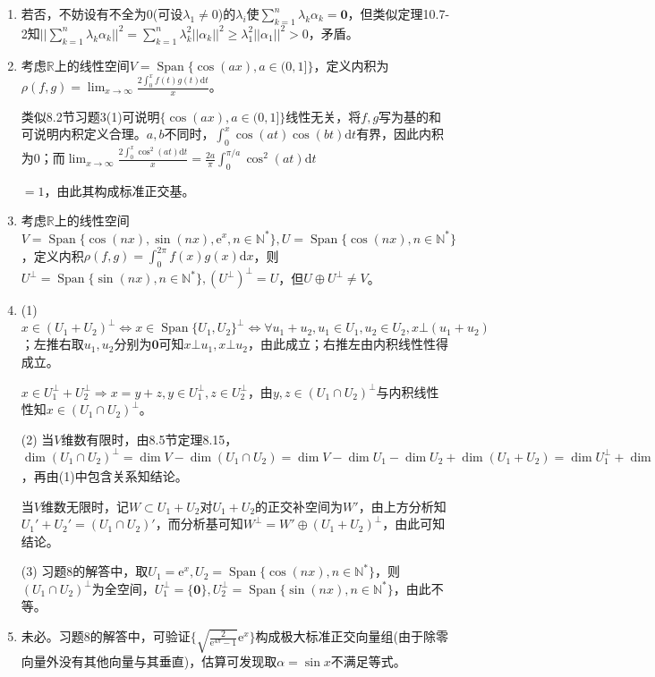 \documentclass[a4paper,UTF8,fontset=windows]{ctexart}
\DeclareMathOperator{\Span}{Span}
\begin{document}
\begin{enumerate}
\item
若否，不妨设有不全为0(可设$\lambda_1\ne0$)的$\lambda_i$使$\sum_{k=1}^n\lambda_k\alpha_k=\mathbf{0}$，但类似定理10.7-2知$\bigg|\bigg|\sum_{k=1}^n\lambda_k\alpha_k\bigg|\bigg|^2=\sum_{k=1}^n\lambda_k^2||\alpha_k||^2\ge\lambda_1^2||\alpha_1||^2>0$，矛盾。

\item
考虑$\mathbb{R}$上的线性空间$V=\Span\{\cos(ax),a\in(0,1]\}$，定义内积为$\rho(f,g)=\lim_{x\to\infty}\frac{2\int_0^xf(t)g(t)\mathrm{d}t}{x}$。

类似8.2节习题3(1)可说明$\{\cos(ax),a\in(0,1]\}$线性无关，将$f,g$写为基的和可说明内积定义合理。$a,b$不同时，$\int_0^x\cos(at)\cos(bt)\mathrm{d}t$有界，因此内积为0；而$\lim_{x\to\infty}\frac{2\int_0^x\cos^2(at)\mathrm{d}t}{x}=\frac{2a}{\pi}\int_0^{\pi/a}\cos^2(at)\mathrm{d}t$

$=1$，由此其构成标准正交基。

\item
考虑$\mathbb{R}$上的线性空间$V=\Span\{\cos(nx),\sin(nx),\mathrm{e}^x,n\in\mathbb{N}^*\},U=\Span\{\cos(nx),n\in\mathbb{N}^*\}$，定义内积$\rho(f,g)=\int_0^{2\pi}f(x)g(x)\mathrm{d}x$，则$U^\bot=\Span\{\sin(nx),n\in\mathbb{N}^*\},(U^\bot)^\bot=U$，但$U\oplus U^\bot\ne V$。

\item
(1) $x\in(U_1+U_2)^\bot\Leftrightarrow x\in\Span\{U_1,U_2\}^\bot\Leftrightarrow\forall u_1+u_2,u_1\in U_1,u_2\in U_2,x\bot(u_1+u_2)$；左推右取$u_1,u_2$分别为$\mathbf{0}$可知$x\bot u_1,x\bot u_2$，由此成立；右推左由内积线性性得成立。

$x\in U_1^\bot+U_2^\bot\Rightarrow x=y+z,y\in U_1^\bot,z\in U_2^\bot$，由$y,z\in(U_1\cap U_2)^\bot$与内积线性性知$x\in(U_1\cap U_2)^\bot$。

(2) 当$V$维数有限时，由8.5节定理8.15，$\dim(U_1\cap U_2)^\bot=\dim{V}-\dim(U_1\cap U_2)=\dim{V}-\dim{U_1}-\dim{U_2}+\dim(U_1+U_2)=\dim{U_1^\bot}+\dim{U_2}^\bot-\dim(U_1+U_2)^\bot=\dim{U_1^\bot}+\dim{U_2}^\bot-\dim(U_1^\bot\cap U_2^\bot)=\dim(U_1^\bot+U_2^\bot)$，再由(1)中包含关系知结论。

当$V$维数无限时，记$W\subset U_1+U_2$对$U_1+U_2$的正交补空间为$W'$，由上方分析知$U_1'+U_2'=(U_1\cap U_2)'$，而分析基可知$W^\bot=W'\oplus(U_1+U_2)^\bot$，由此可知结论。

(3) 习题8的解答中，取$U_1=\mathrm{e}^x,U_2=\Span\{\cos(nx),n\in\mathbb{N}^*\}$，则$(U_1\cap U_2)^\bot$为全空间，$U_1^\bot=\{\mathbf{0}\},U_2^\bot=\Span\{\sin(nx),n\in\mathbb{N}^*\}$，由此不等。

\item
未必。习题8的解答中，可验证$\bigg\{\sqrt{\frac{2}{\mathrm{e}^{4\pi}-1}}\mathrm{e}^x\bigg\}$构成极大标准正交向量组(由于除零向量外没有其他向量与其垂直)，估算可发现取$\alpha=\sin{x}$不满足等式。
\end{enumerate}
\end{document}
